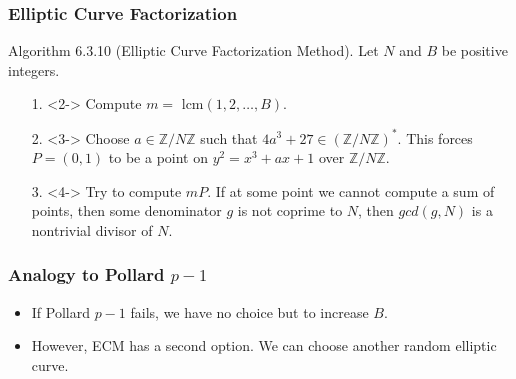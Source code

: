 \documentclass{beamer}
\begin{document}
\begin{frame}
\frametitle{Elliptic Curve Factorization}
\pause
Algorithm 6.3.10 (Elliptic Curve Factorization Method). Let $N$ and $B$ be positive integers.
\begin{itemize}
\item[1.]<2-> Compute $m =$ lcm$(1,2,\ldots, B)$.
\item[2.]<3-> Choose $a \in \mathbb{Z}/N\mathbb{Z}$ such that $4a^3 + 27 \in \left(\mathbb{Z}/N\mathbb{Z}\right)^*$. This forces $P = (0,1)$ to be a point on $y^2 = x^3 + ax +1$ over $\mathbb{Z}/N\mathbb{Z}$.
\item[3.]<4-> Try to compute $mP$. If at some point we cannot compute a sum of points, then some denominator $g$ is not coprime to $N$, then $gcd(g,N)$ is a nontrivial divisor of $N$.
\end{itemize}
\end{frame}

\begin{frame}
\frametitle{Analogy to Pollard $p-1$}
\begin{table}[h!]
  \begin{center}
    \label{tab:table1}
  \end{center}
\end{table}

\begin{itemize}
\item<7-> If Pollard $p-1$ fails, we have no choice but to increase $B$.
\item<8-> However, ECM has a second option. We can choose another random elliptic curve.
\end{itemize}
\end{frame}
\end{document}
